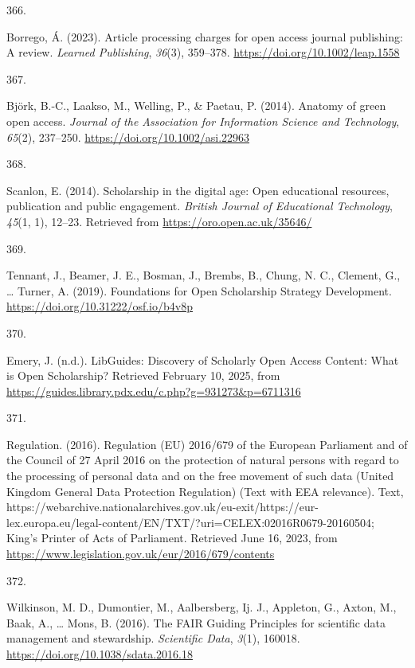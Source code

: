 \documentclass[
  11pt,
  letterpaper,
]{scrreprt}
\newlength{\cslhangindent}
\newlength{\csllabelwidth}
\newenvironment{CSLReferences}[2] %
 {\begin{list}{}{%
  \setlength{\itemindent}{0pt}
  \setlength{\leftmargin}{0pt}
  \setlength{\parsep}{0pt}
  \ifodd #1
   \setlength{\leftmargin}{\cslhangindent}
   \setlength{\itemindent}{-1\cslhangindent}
  \fi
  \setlength{\itemsep}{#2\baselineskip}}}
 {\end{list}}
\newcommand{\CSLLeftMargin}[1]{\parbox[t]{\csllabelwidth}{\strut#1\strut}}
\newcommand{\CSLRightInline}[1]{\parbox[t]{\linewidth - \csllabelwidth}{\strut#1\strut}}
\begin{document}
\begin{CSLReferences}{0}{0}
\CSLLeftMargin{366. }%
\CSLRightInline{Borrego, Á. (2023). Article processing charges for open
access journal publishing: {A} review. \emph{Learned Publishing},
\emph{36}(3), 359--378. \url{https://doi.org/10.1002/leap.1558}}

\CSLLeftMargin{367. }%
\CSLRightInline{Björk, B.-C., Laakso, M., Welling, P., \& Paetau, P.
(2014). Anatomy of green open access. \emph{Journal of the Association
for Information Science and Technology}, \emph{65}(2), 237--250.
\url{https://doi.org/10.1002/asi.22963}}

\CSLLeftMargin{368. }%
\CSLRightInline{Scanlon, E. (2014). Scholarship in the digital age:
{Open} educational resources, publication and public engagement.
\emph{British Journal of Educational Technology}, \emph{45}(1, 1),
12--23. Retrieved from \url{https://oro.open.ac.uk/35646/}}

\CSLLeftMargin{369. }%
\CSLRightInline{Tennant, J., Beamer, J. E., Bosman, J., Brembs, B.,
Chung, N. C., Clement, G., \ldots{} Turner, A. (2019). Foundations for
{Open Scholarship Strategy Development}.
\url{https://doi.org/10.31222/osf.io/b4v8p}}

\CSLLeftMargin{370. }%
\CSLRightInline{Emery, J. (n.d.). {LibGuides}: {Discovery} of {Scholarly
Open Access Content}: {What} is {Open Scholarship}? Retrieved February
10, 2025, from
\url{https://guides.library.pdx.edu/c.php?g=931273&p=6711316}}

\CSLLeftMargin{371. }%
\CSLRightInline{Regulation. (2016). Regulation ({EU}) 2016/679 of the
{European Parliament} and of the {Council} of 27 {April} 2016 on the
protection of natural persons with regard to the processing of personal
data and on the free movement of such data ({United Kingdom General Data
Protection Regulation}) ({Text} with {EEA} relevance). Text,
https://webarchive.nationalarchives.gov.uk/eu-exit/https://eur-lex.europa.eu/legal-content/EN/TXT/?uri=CELEX:02016R0679-20160504;
King's Printer of Acts of Parliament. Retrieved June 16, 2023, from
\url{https://www.legislation.gov.uk/eur/2016/679/contents}}

\CSLLeftMargin{372. }%
\CSLRightInline{Wilkinson, M. D., Dumontier, M., Aalbersberg, Ij. J.,
Appleton, G., Axton, M., Baak, A., \ldots{} Mons, B. (2016). The {FAIR
Guiding Principles} for scientific data management and stewardship.
\emph{Scientific Data}, \emph{3}(1), 160018.
\url{https://doi.org/10.1038/sdata.2016.18}}


\end{CSLReferences}
\end{document}
